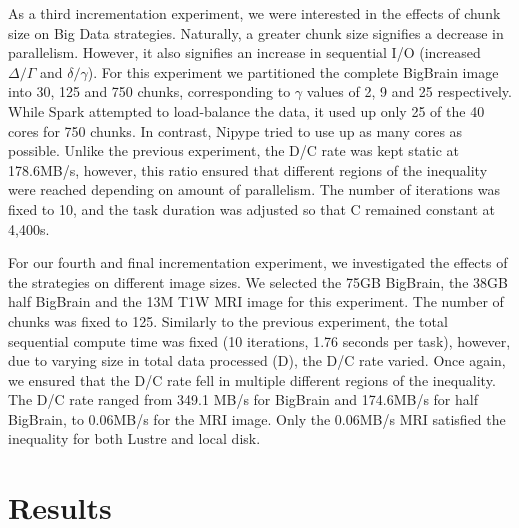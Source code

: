 \documentclass{IEEEtran}
\begin{document}
As a third incrementation experiment, we were interested in the effects of 
chunk size on Big Data strategies. Naturally, a greater chunk size signifies 
a decrease in parallelism. However, it also signifies an increase in 
sequential I/O (increased $\Delta/\Gamma$ and $\delta/\gamma$). For 
this experiment we partitioned the complete BigBrain image into 30, 125 
and 750 chunks, corresponding to $\gamma$ values of 2, 9 and 25 
respectively. While Spark attempted to load-balance the data, it used 
up only 25 of the 40 cores for 750 chunks. In contrast, Nipype tried to 
use up as many cores as possible. Unlike the previous 
experiment, the D/C rate was kept static at 178.6MB/s, however, this 
ratio ensured that different regions of the inequality were reached 
depending on amount of parallelism. The number of iterations was
fixed to 10, and the task duration was adjusted so that C remained constant at 4,400s.

For our fourth and final incrementation experiment, we investigated the effects 
of the strategies on different image sizes. We selected the 75GB BigBrain, the
38GB half BigBrain and the 13M T1W MRI image for this experiment. The number of
chunks was fixed to 125. Similarly to the previous experiment, the 
total sequential compute time was fixed (10 iterations, 1.76 seconds 
per task), however, due to varying size in total data processed (D), 
the D/C rate varied. Once again, we ensured that the D/C rate fell in 
multiple different regions of the inequality. The D/C rate ranged from 
349.1 MB/s for BigBrain and 174.6MB/s for half BigBrain, to 0.06MB/s for the MRI 
image. Only the 0.06MB/s MRI satisfied the inequality for both Lustre and local 
disk.









\section{Results} %
\label{sec:results}
\end{document}
